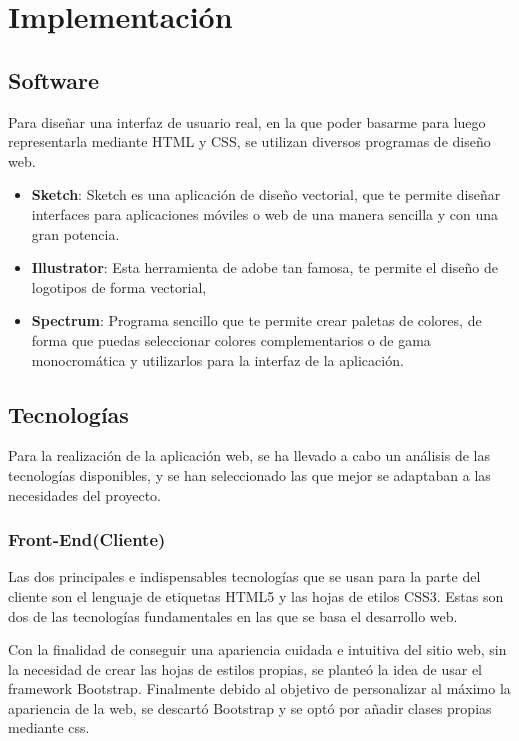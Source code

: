 \chapter{Implementación}

\section{Software}

Para diseñar una interfaz de usuario real, en la que poder basarme para luego representarla mediante HTML y CSS, se utilizan diversos programas de diseño web.

\begin{itemize}

\item \textbf{Sketch}: Sketch es una aplicación de diseño vectorial, que te permite diseñar interfaces para aplicaciones móviles o web de una manera sencilla y con una gran potencia.
\item \textbf{Illustrator}: Esta herramienta de adobe tan famosa, te permite el diseño de logotipos de forma vectorial,
\item \textbf{Spectrum}: Programa sencillo que te permite crear paletas de colores, de forma que puedas seleccionar colores complementarios o de gama monocromática y utilizarlos para la interfaz de la aplicación.

\end{itemize}

\section{Tecnologías}

Para la realización de la aplicación web, se ha llevado a cabo un análisis de las tecnologías disponibles, y se han seleccionado las que mejor se adaptaban a las necesidades del proyecto.

\subsection{Front-End(Cliente)}

Las dos principales e indispensables tecnologías que se usan para la parte del cliente son el lenguaje de etiquetas HTML5 y las hojas de etilos CSS3. Estas son dos de las tecnologías fundamentales en las que se basa el desarrollo web.

 \vspace{5 mm}

 Con la finalidad de conseguir una apariencia cuidada e intuitiva del sitio web, sin la necesidad de crear las hojas de estilos propias, se planteó la idea de usar el framework Bootstrap. Finalmente debido al objetivo de personalizar al máximo la apariencia de la web, se descartó Bootstrap y se optó por añadir clases propias mediante css.


